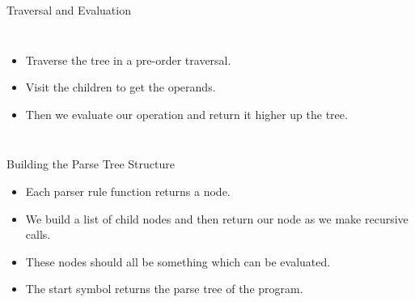 \documentclass[handout]{beamer}
\newenvironment{code}{%
 \VerbatimEnvironment
 \begin{adjustbox}{max width=\textwidth, max height=0.7\textheight}
 \begin{BVerbatim}
  }{
  \end{BVerbatim}
 \end{adjustbox}
}
\newenvironment{scaled}{%
 \begin{adjustbox}{max width=\textwidth, max height=0.7\textheight}
 }{
 \end{adjustbox}
}
\begin{document}
\begin{frame}{Traversal and Evaluation}
\begin{columns}
\begin{itemize}
    \item Traverse the tree in a pre-order traversal.
    \item Visit the children to get the operands.
    \item Then we evaluate our operation and return it higher up the tree.
\end{itemize}
\begin{scaled}
\end{scaled}
\end{columns}
\end{frame}

\begin{frame}{Building the Parse Tree Structure}
    \begin{itemize}
        \item Each parser rule function returns a node.
        \item We build a list of child nodes and then return our node as we make recursive calls.
        \item These nodes should all be something which can be evaluated.
        \item The start symbol returns the parse tree of the program.
    \end{itemize}
\end{frame}

\end{document}
